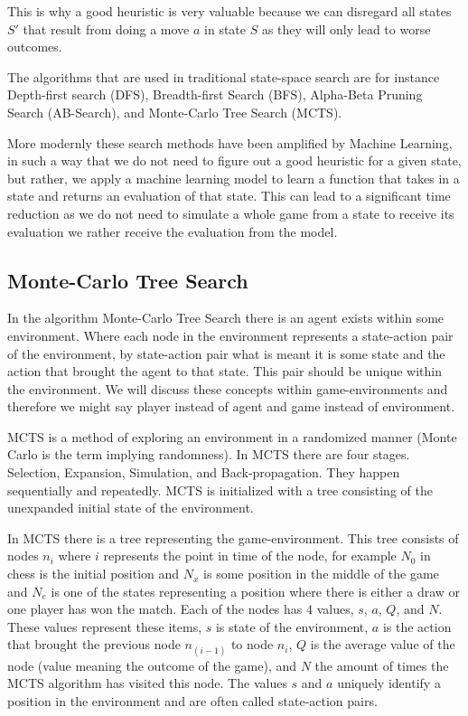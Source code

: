 This is why a good heuristic is very valuable because we can disregard all states $S'$ that 
result from doing a move $a$ in state $S$ as they will only lead to worse outcomes.

The algorithms that are used in traditional state-space search are for instance Depth-first search (DFS),
Breadth-first Search (BFS), Alpha-Beta Pruning Search (AB-Search), and Monte-Carlo Tree Search (MCTS).

More modernly these search methods have been amplified by Machine Learning, in such a way that 
we do not need to figure out a good heuristic for a given state, but rather, we apply a machine 
learning model to learn a function that takes in a state and returns an evaluation of that state.
This can lead to a significant time reduction as we do not need to simulate a whole game from a 
state to receive its evaluation we rather receive the evaluation from the model.

\subsection{Monte-Carlo Tree Search}

\label{sec:mcts}

In the algorithm Monte-Carlo Tree Search there is an agent exists
within some environment. Where each node in the environment represents a state-action pair of the environment, by
state-action pair what is meant it is some state and the action that brought the agent to
that state. This pair should be unique within the environment. We will discuss these concepts within game-environments
and therefore we might say player instead of agent and game instead of environment.

MCTS is a method of exploring an environment in a randomized manner (Monte Carlo is the term implying
randomness). In MCTS there are four stages. Selection, Expansion, Simulation, and Back-propagation. They happen sequentially
and repeatedly. MCTS is initialized with a tree consisting of the unexpanded initial state of the environment.

In MCTS there is a tree representing the game-environment. This tree consists of nodes $n_i$ where $i$ represents the point in time
of the node, for example $N_0$ in chess is the initial position and $N_x$ is some position in the middle of the game and $N_e$ is one of
the states representing a position where there is either a draw or one player has won the match. Each of the nodes has $4$ values,
$s$, $a$, $Q$, and $N$. These values represent these items, $s$ is state of the environment, $a$ is the action that brought
the previous node $n_(i-1)$ to node $n_i$, $Q$ is the average value of the node (value meaning the outcome of the game),
and $N$ the amount of times the MCTS algorithm has visited this node. The values $s$ and $a$ uniquely identify a position
in the environment and are often called state-action pairs.

